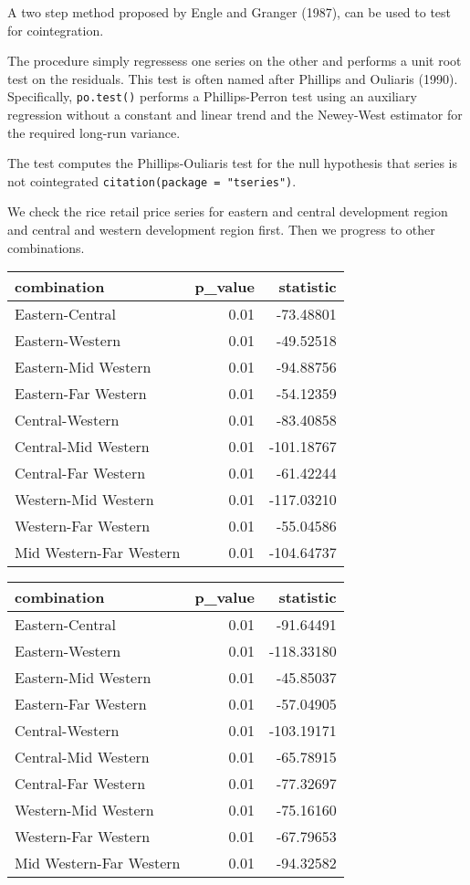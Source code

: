 \documentclass[12pt,]{article}
\begin{document}
A two step method proposed by Engle and Granger (1987), can be used to test for cointegration.

The procedure simply regressess one series on the other and performs a unit root test on the residuals. This test is often named after Phillips and Ouliaris (1990). Specifically, \texttt{po.test()} performs a Phillips-Perron test using an auxiliary regression without a constant and linear trend and the Newey-West estimator for the required long-run variance.

The test computes the Phillips-Ouliaris test for the null hypothesis that series is not cointegrated \texttt{citation(package\ =\ "tseries")}.

We check the rice retail price series for eastern and central development region and central and western development region first. Then we progress to other combinations.

\begin{tabular}{lrr}
\toprule
combination & p\_value & statistic\\
\midrule
Eastern-Central & 0.01 & -73.48801\\
Eastern-Western & 0.01 & -49.52518\\
Eastern-Mid Western & 0.01 & -94.88756\\
Eastern-Far Western & 0.01 & -54.12359\\
Central-Western & 0.01 & -83.40858\\
\addlinespace
Central-Mid Western & 0.01 & -101.18767\\
Central-Far Western & 0.01 & -61.42244\\
Western-Mid Western & 0.01 & -117.03210\\
Western-Far Western & 0.01 & -55.04586\\
Mid Western-Far Western & 0.01 & -104.64737\\
\bottomrule
\end{tabular}

\begin{tabular}{lrr}
\toprule
combination & p\_value & statistic\\
\midrule
Eastern-Central & 0.01 & -91.64491\\
Eastern-Western & 0.01 & -118.33180\\
Eastern-Mid Western & 0.01 & -45.85037\\
Eastern-Far Western & 0.01 & -57.04905\\
Central-Western & 0.01 & -103.19171\\
\addlinespace
Central-Mid Western & 0.01 & -65.78915\\
Central-Far Western & 0.01 & -77.32697\\
Western-Mid Western & 0.01 & -75.16160\\
Western-Far Western & 0.01 & -67.79653\\
Mid Western-Far Western & 0.01 & -94.32582\\
\bottomrule
\end{tabular}
\end{document}
